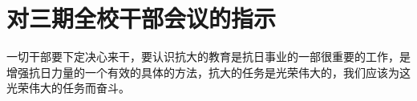 \section[对三期全校干部会议的指示（一九三七年）]{对三期全校干部会议的指示}


一切干部要下定决心来干，要认识抗大的教育是抗日事业的一部很重要的工作，是增强抗日力量的一个有效的具体的方法，抗大的任务是光荣伟大的，我们应该为这光荣伟大的任务而奋斗。


